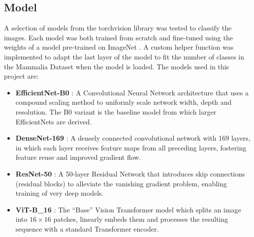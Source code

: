     \subsection{Model}
    A selection of models from the torchvision library was tested to classify the images.
    Each model was both trained from scratch and fine-tuned using the weights of a model pre-trained on ImageNet \autocite{dengImageNetLargescaleHierarchical2009}.
    A custom helper function was implemented to adapt the last layer of the model to fit the number of classes in the Mammalia Dataset when the model is loaded.
    The models used in this project are:

    \begin{itemize}
        \item \textbf{EfficientNet-B0} \autocite{tanEfficientNetRethinkingModel2019}:  
        A Convolutional Neural Network architecture that uses a compound scaling method to uniformly scale network width, depth and resolution.  
        The B0 variant is the baseline model from which larger EfficientNets are derived.  

        \item \textbf{DenseNet-169} \autocite{huangDenselyConnectedConvolutional2017}:  
        A densely connected convolutional network with 169 layers, in which each layer receives feature maps from all preceding layers, fostering feature reuse and improved gradient flow.  

        \item \textbf{ResNet-50} \autocite{heDeepResidualLearning2016}:  
        A 50-layer Residual Network that introduces skip connections (residual blocks) to alleviate the vanishing gradient problem, enabling training of very deep models.  

        \item \textbf{ViT-B\_16} \autocite{dosovitskiyImageWorth16x162021}:  
        The “Base” Vision Transformer model which splits an image into \(16\times 16\) patches, linearly embeds them and processes the resulting sequence with a standard Transformer encoder.  
    \end{itemize}

